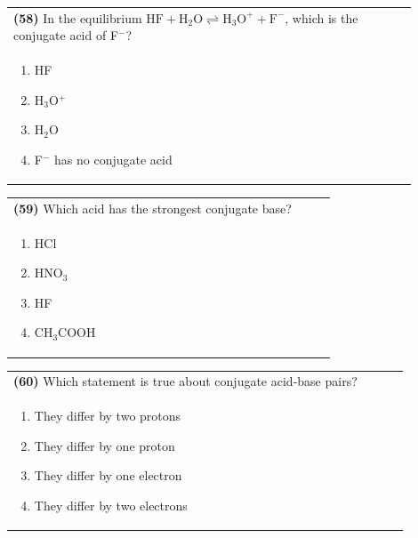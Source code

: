 \documentclass{article}
\begin{document}
\noindent\begin{tabular}{|p{0.9\linewidth}|}
\hline
\textbf{(58)} In the equilibrium $\text{HF} + \text{H}_2\text{O} \rightleftharpoons \text{H}_3\text{O}^+ + \text{F}^-$, which is the conjugate acid of F$^-$? \\[0.2cm]
\begin{minipage}[t]{0.85\linewidth}
\begin{enumerate}[label=\alph*.]
\item HF
\item H$_3$O$^+$
\item H$_2$O
\item F$^-$ has no conjugate acid
\end{enumerate}
\end{minipage}\\[0.2cm]
\hline
\end{tabular}

\noindent\begin{tabular}{|p{0.9\linewidth}|}
\hline
\textbf{(59)} Which acid has the strongest conjugate base? \\[0.2cm]
\begin{minipage}{0.85\linewidth}
\begin{enumerate}[label=\alph*.]
\item HCl \item HNO$_3$ \item HF \item CH$_3$COOH
\end{enumerate}
\end{minipage}\\[0.2cm]
\hline
\end{tabular}

\noindent\begin{tabular}{|p{0.9\linewidth}|}
\hline
\textbf{(60)} Which statement is true about conjugate acid-base pairs? \\[0.2cm]
\begin{minipage}{0.85\linewidth}
\begin{enumerate}[label=\alph*.]
\item They differ by two protons \item They differ by one proton \item They differ by one electron \item They differ by two electrons
\end{enumerate}
\end{minipage}\\[0.2cm]
\hline
\end{tabular}
\end{document}
